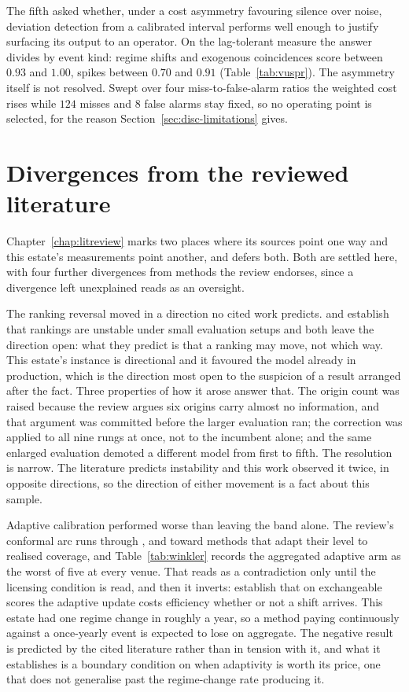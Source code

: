 The fifth asked whether, under a cost asymmetry favouring silence over noise, deviation detection
from a calibrated interval performs well enough to justify surfacing its output to an operator. On
the lag-tolerant measure the answer divides by event kind: regime shifts and exogenous
coincidences score between $0.93$ and $1.00$, spikes between $0.70$ and $0.91$
(Table~\ref{tab:vuspr}). The asymmetry itself is not resolved. Swept over
four miss-to-false-alarm ratios the weighted cost rises while $124$ misses and $8$ false alarms
stay fixed, so no operating point is selected, for the reason
Section~\ref{sec:disc-limitations} gives.

\section{Divergences from the reviewed literature}
\label{sec:disc-divergences}

Chapter~\ref{chap:litreview} marks two places where its sources point one way and this estate's
measurements point another, and defers both. Both are settled here, with four further divergences
from methods the review endorses, since a divergence left unexplained reads as an oversight.

The ranking reversal moved in a direction no cited work predicts.
\citet{hewamalage_look_2021} and \citet{brigato_there_2025} establish that rankings are unstable
under small evaluation setups and both leave the direction open: what they predict is that a
ranking may move, not which way. This estate's instance is directional and it favoured the model
already in production, which is the direction most open to the suspicion of a result arranged
after the fact. Three properties of how it arose answer that. The origin count was raised because
the review argues six origins carry almost no information, and that argument was committed before
the larger evaluation ran; the correction was applied to all nine rungs at once, not to
the incumbent alone; and the same enlarged evaluation demoted a different model from first to fifth.
The resolution is narrow. The literature predicts instability and this work observed it twice, in
opposite directions, so the direction of either movement is a fact about this sample.

Adaptive calibration performed worse than leaving the band alone. The review's conformal arc runs
through \citet{gibbs_adaptive_2021}, \citet{zaffran_adaptive_2022} and
\citet{sun_conformal_2025} toward methods that adapt their level to realised coverage, and
Table~\ref{tab:winkler} records the aggregated adaptive arm as the worst of five at every venue.
That reads as a contradiction only until the licensing condition is read, and then it inverts:
\citet{zaffran_adaptive_2022} establish that on exchangeable scores the adaptive update costs
efficiency whether or not a shift arrives. This estate had one regime change in roughly a year,
so a method paying continuously against a once-yearly event is expected to lose on aggregate. The
negative result is predicted by the cited literature rather than in tension with it, and what it
establishes is a boundary condition on when adaptivity is worth its price, one that does not
generalise past the regime-change rate producing it.

